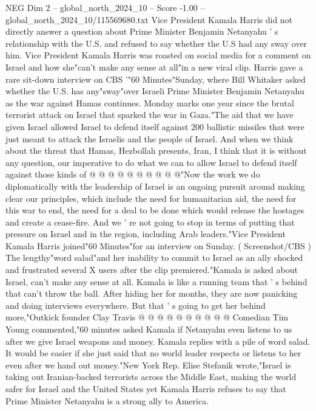 \begin{textsample}{NEG Dim 2 – global\_north\_2024\_10 – Score -1.00 – global\_north\_2024\_10/115569680.txt}  \label{ex:f2_neg_100}
Vice President Kamala Harris did not directly answer a question about Prime Minister Benjamin Netanyahu ' s relationship with the U.S. and refused to say whether the U.S had any sway over him.
Vice President Kamala Harris was roasted on social media for a comment on Israel and how she"can't make any sense at all"in a new viral clip.
Harris gave a rare sit-down interview on CBS '"60 Minutes"Sunday, where Bill Whitaker asked whether the U.S. has any"sway"over Israeli Prime Minister Benjamin Netanyahu as the war against Hamas continues.
Monday marks one year since the brutal terrorist attack on Israel that sparked the war in Gaza."The aid that we have given Israel allowed Israel to defend itself against 200 ballistic missiles that were just meant to attack the Israelis and the people of Israel.
And when we think about the threat that Hamas, Hezbollah presents, Iran, I think that it is without any question, our imperative to do what we can to allow Israel to defend itself against those kinds of @ @ @ @ @ @ @ @ @ @"Now the work we do diplomatically with the leadership of Israel is an ongoing pursuit around making clear our principles, which include the need for humanitarian aid, the need for this war to end, the need for a deal to be done which would release the hostages and create a cease-fire.
And we ' re not going to stop in terms of putting that pressure on Israel and in the region, including Arab leaders."Vice President Kamala Harris joined"60 Minutes"for an interview on Sunday. ( Screenshot/CBS ) The lengthy"word salad"and her inability to commit to Israel as an ally shocked and frustrated several X users after the clip premiered."Kamala is asked about Israel, can't make any sense at all.
Kamala is like a running team that ' s behind that can't throw the ball.
After hiding her for months, they are now panicking and doing interviews everywhere.
But that ' s going to get her behind more,"Outkick founder Clay Travis @ @ @ @ @ @ @ @ @ @ Comedian Tim Young commented,"60 minutes asked Kamala if Netanyahu even listens to us after we give Israel weapons and money.
Kamala replies with a pile of word salad.
It would be easier if she just said that no world leader respects or listens to her even after we hand out money."New York Rep.
Elise Stefanik wrote,"Israel is taking out Iranian-backed terrorists across the Middle East, making the world safer for Israel and the United States yet Kamala Harris refuses to say that Prime Minister Netanyahu is a strong ally to America.

\end{textsample}
